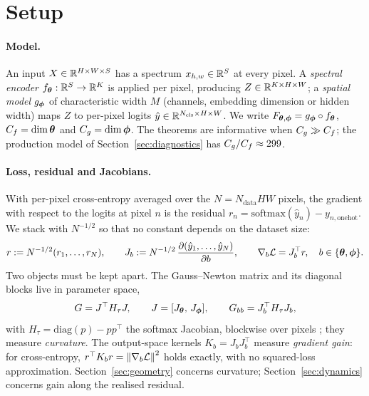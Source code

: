 \section{Setup}
\label{sec:setup}

\paragraph{Model.}
An input $X\in\mathbb{R}^{H\times W\times S}$ has a spectrum $x_{h,w}\in\mathbb{R}^S$ at
every pixel. A \emph{spectral encoder} $f_{\boldsymbol{\theta}}:\mathbb{R}^S\to\mathbb{R}^K$ is applied
per pixel, producing $Z\in\mathbb{R}^{K\times H\times W}$; a \emph{spatial model}
$g_{\boldsymbol{\phi}}$ of characteristic width $M$ (channels, embedding dimension or
hidden width) maps $Z$ to per-pixel logits $\hat y\in\mathbb{R}^{N_{\mathrm{cls}}
\times H\times W}$. We write $F_{{\boldsymbol{\theta}},{\boldsymbol{\phi}}}=g_{\boldsymbol{\phi}}\circ f_{\boldsymbol{\theta}}$,
$C_f=\dim{\boldsymbol{\theta}}$ and $C_g=\dim{\boldsymbol{\phi}}$. The theorems are informative when
$C_g\gg C_f$; the production model of Section~\ref{sec:diagnostics} has
$C_g/C_f\approx 299$.

\paragraph{Loss, residual and Jacobians.}
With per-pixel cross-entropy averaged over the $N=N_{\mathrm{data}}HW$
pixels, the gradient with respect to the logits at pixel $n$ is the residual
$r_n=\mathrm{softmax}(\hat y_n)-y_{n,\mathrm{onehot}}$. We stack with
$N^{-1/2}$ so that no constant depends on the dataset size:
\begin{equation}
\label{eq:jacobians}
  r:=N^{-1/2}(r_1,\dots,r_N),\qquad
  J_b:=N^{-1/2}\,\frac{\partial(\hat y_1,\dots,\hat y_N)}{\partial b},\qquad
  \nabla_b\mathcal{L}=J_b^\top r,\quad b\in\{{\boldsymbol{\theta}},{\boldsymbol{\phi}}\}.
\end{equation}
Two objects must be kept apart. The Gauss--Newton matrix and its diagonal
blocks live in parameter space,
\begin{equation}
\label{eq:ggn}
  G=J^\top H_\tau J,\qquad J=[J_{\boldsymbol{\theta}},\,J_{\boldsymbol{\phi}}],\qquad
  G_{bb}=J_b^\top H_\tau J_b,
\end{equation}
with $H_\tau=\mathrm{diag}(p)-pp^\top$ the softmax Jacobian, blockwise over
pixels \citep{botev2017practical}; they measure \emph{curvature}. The
output-space kernels $K_b=J_bJ_b^\top$ measure \emph{gradient gain}: for
cross-entropy, $r^\top K_br=\left\lVert\nabla_b\mathcal{L}\right\rVert^2$ holds exactly, with no
squared-loss approximation. Section~\ref{sec:geometry} concerns curvature;
Section~\ref{sec:dynamics} concerns gain along the realised residual.

